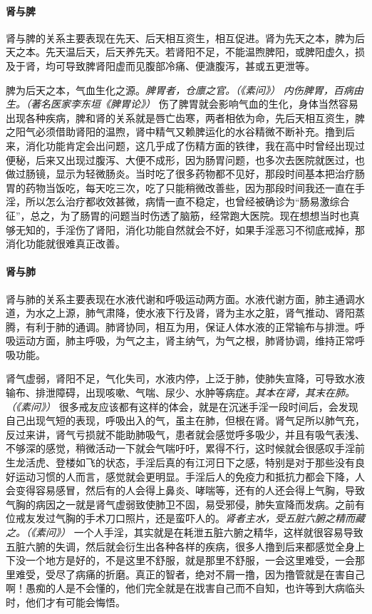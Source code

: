\paragraph{肾与脾}

肾与脾的关系主要表现在先天、后天相互资生，相互促进。肾为先天之本，脾为后天之本。先天温后天，后天养先天。若肾阳不足，不能温煦脾阳，或脾阳虚久，损及于肾，均可导致脾肾阳虚而见腹部冷痛、便溏腹泻，甚或五更泄等。

脾为后天之本，气血生化之源。\textit{脾胃者，仓廪之官。（《素问》）} \textit{内伤脾胃，百病由生。（著名医家李东垣《脾胃论》）} 伤了脾胃就会影响气血的生化，身体当然容易出现各种疾病，脾和肾的关系就是唇亡齿寒，两者相依为命，先后天相互资生，脾之阳气必须借助肾阳的温煦，肾中精气又赖脾运化的水谷精微不断补充。撸到后来，消化功能肯定会出问题，这几乎成了伤精方面的铁律，我在高中时曾经出现过便秘，后来又出现过腹泻、大便不成形，因为肠胃问题，也多次去医院就医过，也做过肠镜，显示为轻微肠炎。当时吃了很多药物都不见好，那段时间基本把治疗肠胃的药物当饭吃，每天吃三次，吃了只能稍微改善些，因为那段时间我还一直在手淫，所以怎么治疗都收效甚微，病情一直不稳定，也曾经被确诊为“肠易激综合征”，总之，为了肠胃的问题当时伤透了脑筋，经常跑大医院。现在想想当时也真够无知的，手淫伤了肾阳，消化功能自然就会不好，如果手淫恶习不彻底戒掉，那消化功能就很难真正改善。

\paragraph{肾与肺}

肾与肺的关系主要表现在水液代谢和呼吸运动两方面。水液代谢方面，肺主通调水道，为水之上源，肺气肃降，使水液下行及肾，肾为主水之脏，肾气推动、肾阳蒸腾，有利于肺的通调。肺肾协同，相互为用，保证人体水液的正常输布与排泄。呼吸运动方面，肺主呼吸，为气之主，肾主纳气，为气之根，肺肾协调，维持正常呼吸功能。

肾气虚弱，肾阳不足，气化失司，水液内停，上泛于肺，使肺失宣降，可导致水液输布、排泄障碍，出现咳嗽、气喘、尿少、水肿等病症。\textit{其本在肾，其末在肺。（《素问》）} 很多戒友应该都有这样的体会，就是在沉迷手淫一段时间后，会发现自己出现气短的表现，呼吸出入的气，虽主在肺，但根在肾。肾气足所以肺气充，反过来讲，肾气亏损就不能助肺吸气，患者就会感觉呼多吸少，并且有吸气表浅、不够深的感觉，稍微活动一下就会气喘吁吁，累得不行，这时候就会很感叹手淫前生龙活虎、登楼如飞的状态，手淫后真的有江河日下之感，特别是对于那些没有良好运动习惯的人而言，感觉就会更明显。手淫后人的免疫力和抵抗力都会下降，人会变得容易感冒，然后有的人会得上鼻炎、哮喘等，还有的人还会得上气胸，导致气胸的病因之一就是肾气虚弱致使肺卫不固，易受邪侵，肺失宣降而发病。之前有位戒友发过气胸的手术刀口照片，还是蛮吓人的。\textit{肾者主水，受五脏六腑之精而藏之。（《素问》）} 一个人手淫，其实就是在耗泄五脏六腑之精华，这样就很容易导致五脏六腑的失调，然后就会衍生出各种各样的疾病，很多人撸到后来都感觉全身上下没一个地方是好的，不是这里不舒服，就是那里不舒服，一会这里难受，一会那里难受，受尽了病痛的折磨。真正的智者，绝对不屑一撸，因为撸管就是在害自己啊！愚痴的人是不会懂的，他们完全就是在戕害自己而不自知，也许等到大病临头时，他们才有可能会悔悟。

